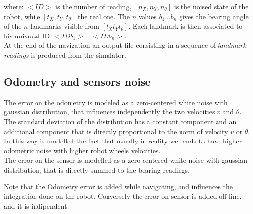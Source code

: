 where:
\textit{$<ID>$} is the number of reading, $[n_X, n_Y, n_{\theta}]$ is the noised state of the robot, while $[t_X, t_Y, t_{\theta}]$ the real one.
The $n$ values $ b_1 ... b_n$ gives the bearing angle of the $n$ landmarks visible from $[t_X t_Y t_{\theta}]$. Each landmark is then associated to his univocal ID 
$<IDb_1> ... <IDb_n>$.\\
At the end of the navigation an output file consisting in a sequence of \textit{landmark readings} is produced from the simulator.

\subsection{Odometry and sensors noise}
The error on the odometry is modeled as a zero-centered white noise with gaussian distribution, that influences independently the two velocities $v$ and $\theta$.
The standard deviation of the distribution has a constant component and an additional component that is directly proportional to the norm of velocity $v$ or $\theta$.
In this way is modelled the fact that usually in reality we tends to have higher odometric noise with higher robot wheels velocities.
\\
The error on the sensor is modelled as a zero-centered white noise with gaussian distribution, that is directly summed to the bearing readings.

Note that the Odometry error is added while navigating, and influences the integration done on the robot. Conversely the error on sensor is added off-line, and it is indipendent 



